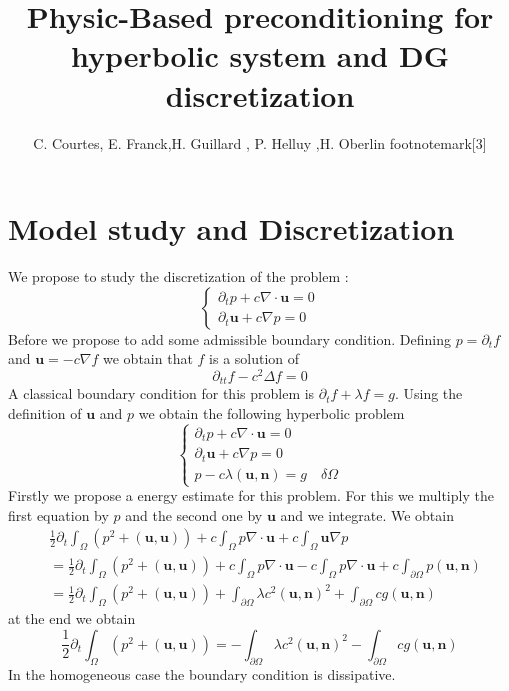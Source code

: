 \documentclass[a4paper,twoside,french,english,11pt]{article}
\title{Physic-Based preconditioning for hyperbolic system and DG discretization}
\author{C. Courtes\footnotemark[4], E. Franck\footnotemark[1],\quad H. Guillard \footnotemark[3], \quad P. Helluy \footnotemark[3],H. Oberlin footnotemark[3]}
\newcommand{\ds}{\displaystyle}
\newcommand{\dt}{\partial_t}
\begin{document}
\maketitle


\tableofcontents

\section{Model study and Discretization}
We propose to study the discretization of the problem :
$$
\left\{\begin{array}{l}
\ds \dt p+c\nabla \cdot \bm{u}=0\\
\ds \dt \bm{u}+c\nabla p = 0 \end{array}\right.
$$
Before we propose to add some admissible boundary condition. Defining $p=\dt f$ and $\bm{u}=- c\nabla f$ we obtain that $f$ is a solution of 
$$
\partial_{tt} f-c^2\Delta f=0
$$
A classical boundary condition for this problem is $\dt f+ \lambda f=g$. Using the definition of $\bm{u}$ and $p$ we obtain the following hyperbolic problem
$$
\left\{\begin{array}{l}
\ds \dt p+c\nabla \cdot \bm{u}=0\\
\ds \dt \bm{u}+c\nabla p = 0 \\
p-c \lambda (\bm{u},\bm{n})=g\quad \delta \Omega \end{array}\right.
$$
Firstly we propose a energy estimate for this problem. For this we multiply the first equation by $p$ and the second one by $\bm{u}$ and we integrate. We obtain
\begin{align*}
& \frac{1}{2}\dt\int_{\Omega}(p^2+(\bm{u},\bm{u}))+c\int_{\Omega}p\nabla \cdot \bm{u} + c\int_{\Omega} \bm{u} \nabla p\\
&=  \frac{1}{2}\dt \int_{\Omega}(p^2+(\bm{u},\bm{u}))+c\int_{\Omega}p\nabla \cdot \bm{u} - c\int_{\Omega}p\nabla \cdot \bm{u}+c\int_{\partial \Omega} p (\bm{u},\bm{n})\\
&=  \frac{1}{2}\dt \int_{\Omega}(p^2+(\bm{u},\bm{u}))+\int_{\partial \Omega} \lambda c^2 (\bm{u},\bm{n})^2+ \int_{\partial \Omega} c g (\bm{u},\bm{n})
\end{align*}
at the end we obtain
$$
\frac{1}{2}\dt \int_{\Omega}(p^2+(\bm{u},\bm{u}))=-\int_{\partial \Omega} \lambda c^2 (\bm{u},\bm{n})^2- \int_{\partial \Omega} c g (\bm{u},\bm{n})
$$
In the homogeneous case the boundary condition is dissipative. 
\end{document}
